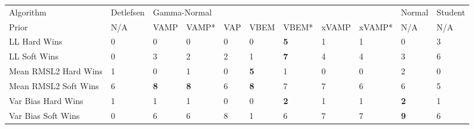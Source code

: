 \begin{tabular}{lllllllllll}
\toprule
Algorithm & Detlefsen & \multicolumn{7}{l}{Gamma-Normal} &      Normal & Student \\
Prior &       N/A &         VAMP &       VAMP* & VAP &        VBEM &       VBEM* & xVAMP & xVAMP* &         N/A &     N/A \\
\midrule
LL Hard Wins         &         0 &            0 &           0 &   0 &           0 &  \textbf{5} &     1 &      1 &           0 &       3 \\
LL Soft Wins         &         0 &            3 &           2 &   2 &           1 &  \textbf{7} &     4 &      4 &           3 &       6 \\
Mean RMSL2 Hard Wins &         1 &            0 &           1 &   0 &  \textbf{5} &           1 &     0 &      0 &           2 &       0 \\
Mean RMSL2 Soft Wins &         6 &   \textbf{8} &  \textbf{8} &   6 &  \textbf{8} &           7 &     7 &      6 &           6 &       5 \\
Var Bias Hard Wins   &         1 &            1 &           1 &   0 &           0 &  \textbf{2} &     1 &      1 &  \textbf{2} &       1 \\
Var Bias Soft Wins   &         0 &            6 &           6 &   8 &           1 &           6 &     7 &      7 &  \textbf{9} &       6 \\
\bottomrule
\end{tabular}

